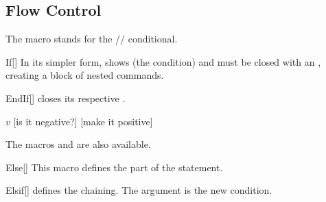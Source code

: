 \documentclass[a4paper, 11pt]{article}
\begin{document}
\begin{tcblisting}{}
    \begin{algorithmic}
        \EndIf
    \end{algorithmic}
\end{tcblisting}

\subsection{Flow Control}\label{sec:flow-control}
The macro  stands for the // conditional.

\begin{macro}{If}[]
    In its simpler form,  shows  (the condition) and must be closed with an , creating a block of nested commands.

    \BlockOptionsText
\end{macro}

\begin{macro}{EndIf}[]
     closes its respective .

    \MacroOptionsText
\end{macro}

\begin{tcblisting}{}
    \begin{algorithmic}
        \State \Read $v$
        [is it negative?]
            [make it positive]
        \EndIf
    \end{algorithmic}
\end{tcblisting}

The macros  and  are also available.

\begin{macro}{Else}[]
    This macro defines the  part of the  statement.

    \BlockOptionsText
\end{macro}

\begin{macro}{Elsif}[]
     defines the  chaining. The argument  is the new condition.

    \BlockOptionsText
\end{macro}
\end{document}
